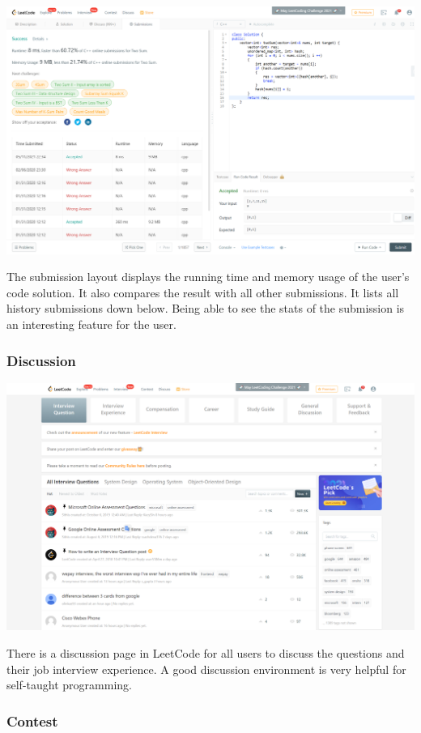 \documentclass[a4paper]{report}
\begin{document}
\includegraphics[width=\linewidth]{Two-Sum-LeetCode-Submission}

The submission layout displays the running time and memory usage of the user's code solution. It also compares the result with all other submissions. It lists all history submissions down below. Being able to see the stats of the submission is an interesting feature for the user.

\subsubsection{Discussion}

\includegraphics[width=\linewidth]{nterview-Question-LeetCode-Discuss}

There is a discussion page in LeetCode for all users to discuss the questions and their job interview experience. A good discussion environment is very helpful for self-taught programming.

\subsubsection{Contest}
\end{document}
